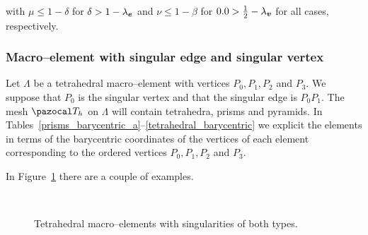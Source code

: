 with $\mu\leqslant 1-\delta$ for $\delta>1-\lambda_{\boldsymbol{e}}$ and 
$\nu\leqslant 1-\beta$ for $\beta>\frac12-\lambda_{\bv}$ for all cases, 
respectively.
\subsubsection{Macro--element with singular edge and singular vertex}\label{caso4}
Let $\Lambda$ be a tetrahedral macro--element with vertices $P_0, P_1, P_2$ and $P_3$.
We suppose that $P_0$ is the singular vertex and that the
singular edge is $P_0P_1$. The mesh $\pazocal T_h$ on $\Lambda$ will 
contain tetrahedra, prisms and pyramids. 
In Tables~\ref{prisms_barycentric_a}--\ref{tetrahedral_barycentric}
we explicit the elements in terms
of the barycentric coordinates of the vertices of each element corresponding to 
the ordered vertices $P_0, P_1, P_2$ and $P_3$.
\bigskip

\prismsBaryCoordA                        %

\prismsBaryCoordB

\pyramidsBaryCoord

\tetrahedraBaryCoord
In Figure~\ref{aux_label70} there are a couple of examples.
\begin{figure}
  \centering
  \subfloat[$n=0$]
  {
    \tetrahedralmacroelementA
  }\hspace{1cm}
  \subfloat[$n=1$]
  {
    \tetrahedralmacroelementB
  }\hspace{1cm}
  \subfloat[$n=2$]
  {
    \tetrahedralmacroelementC
  }\\
  \subfloat[$n=3$]
  {
    \tetrahedralmacroelementD
  }\hspace{1cm}
  \subfloat[$n=4$]
  {
    \tetrahedralmacroelementE
  }\hspace{1cm}
  \subfloat[$n=5$]
  {
    \tetrahedralmacroelementF
  }
  \caption{Tetrahedral macro--elements with singularities of both types.}
  \label{aux_label70}
\end{figure}
\newpage
